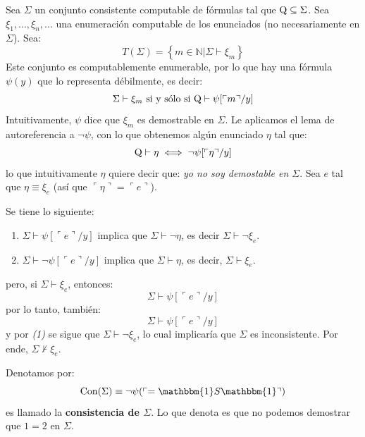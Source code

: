 \documentclass[12pt]{report}
\newcounter{it}
\theoremstyle{largebreak}
\newcommand{\bbm}[1]{\ensuremath{\mathbbm{#1}}}
\newcommand{\winecomma}[1]{\ensuremath{\ulcorner#1\urcorner}}
\begin{document}
    Sea $\Sigma$ un conjunto consistente computable de fórmulas tal que $\textup{Q}\subseteq\Sigma$. Sea $\xi_1,...,\xi_n,...$ una enumeración computable de los enunciados (no necesariamente en $\Sigma$). Sea:
    \begin{equation*}
        T\left(\Sigma \right)=\left\{m\in\mathbb{N}\Big|\Sigma\vdash\xi_m \right\} 
    \end{equation*}
    Este conjunto es computablemente enumerable, por lo que hay una fórmula $\psi(y)$ que lo representa débilmente, es decir:
    \begin{equation*}
        \Sigma\vdash\xi_m\textup{ si y sólo si }\RA\vdash\psi[\winecomma{m}/y]
    \end{equation*}
    Intuitivamente, $\psi$ dice que $\xi_m$ es demostrable en $\Sigma$. Le aplicamos el lema de autoreferencia a $\neg\psi$, con lo que obtenemos algún enunciado $\eta$ tal que:
    \begin{equation*}
        \RA\vdash\eta\iff\neg\psi[\winecomma{\eta}/y]
    \end{equation*}
    lo que intuitivamente $\eta$ quiere decir que: \textit{yo no soy demostable en $\Sigma$}. Sea $e$ tal que $\eta\equiv\xi_e$ (así que $\winecomma{\eta}=\winecomma{e}$).

    \begin{obs}
        Se tiene lo siguiente:
        \begin{enumerate}[label = \textit{(\arabic*)}]
            \item $\Sigma\vdash\psi[\winecomma{e}/y]$ implica que $\Sigma\vdash\neg\eta$, es decir $\Sigma\vdash\neg\xi_e$.
            \item $\Sigma\vdash\neg\psi[\winecomma{e}/y]$ implica que $\Sigma\vdash\eta$, es decir, $\Sigma\vdash\xi_e$.
        \end{enumerate}
        pero, si $\Sigma\vdash\xi_e$, entonces:
        \begin{equation*}
            \Sigma\vdash\psi[\winecomma{e}/y]
        \end{equation*}
        por lo tanto, también:
        \begin{equation*}
            \Sigma\vdash\psi[\winecomma{e}/y]
        \end{equation*}
        y por \textit{(1)} se sigue que $\Sigma\vdash\neg\xi_e$, lo cual implicaría que $\Sigma$ es inconsistente. Por ende, $\Sigma\nvdash\xi_e$.
    \end{obs}

    Denotamos por:
    \begin{equation*}
        \textup{Con}(\Sigma)\equiv\neg\psi(\winecomma{=\bbm{1}S\bbm{1}})
    \end{equation*}
    es llamado la \textbf{consistencia de $\Sigma$}. Lo que denota es que no podemos demostrar que $1=2$ en $\Sigma$.
\end{document}
